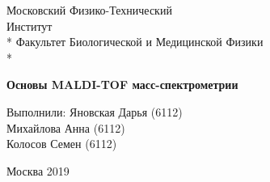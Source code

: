 \documentclass[12pt]{article}
\begin{document}
\begin{titlepage}
\newpage
\begin{center}
\vspace{1cm}%
\LARGE Московский Физико-Технический\\ Институт \\*
\vspace{5mm}
\large Факультет Биологической и Медицинской Физики\\*
\hrulefill %
\end{center}
\vspace{5em}
\begin{center}
\textbf{\huge Основы MALDI-TOF масс-спектрометрии} 
\end{center}
\vspace{20em}
\begin{flushright}
Выполнили: 
\hspace{1em}  
Яновская Дарья (6112)\\
Михайлова Анна (6112)\\
Колосов Семен (6112)\\
\vspace{1.5em}
\end{flushright}
\vspace{\fill}
\begin{center}
Москва 2019
\end{center}
\end{titlepage}
 
\newpage
\end{document}
